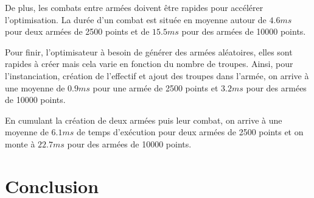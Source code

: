 \documentclass[a4paper]{article} %
\begin{document}
De plus, les combats entre armées doivent être rapides pour accélérer l'optimisation. La durée d'un combat est située en moyenne autour de $4.6ms$ pour deux armées de 2500 points et de $15.5ms$ pour des armées de 10000 points.

Pour finir, l'optimisateur à besoin de générer des armées aléatoires, elles sont rapides à créer mais cela varie en fonction du nombre de troupes. Ainsi, pour l'instanciation, création de l'effectif et ajout des troupes dans l'armée, on arrive à une moyenne de $0.9ms$ pour une armée de 2500 points et $3.2ms$ pour des armées de 10000 points.

En cumulant la création de deux armées puis leur combat, on arrive à une moyenne de $6.1ms$ de temps d'exécution pour deux armées de 2500 points et on monte à $22.7ms$ pour des armées de 10000 points.

\section{Conclusion}
\end{document}
